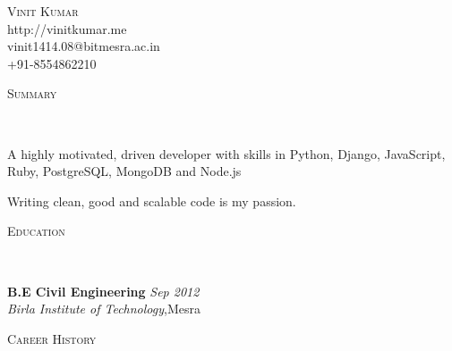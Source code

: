 \documentclass[9pt]{article}
\newenvironment{changemargin}[2]{%
  \begin{list}{}{%
    \setlength{\topsep}{0pt}%
    \setlength{\leftmargin}{#1}%
    \setlength{\rightmargin}{#2}%
    \setlength{\listparindent}{\parindent}%
    \setlength{\itemindent}{\parindent}%
    \setlength{\parsep}{\parskip}%
  }%
  \item[]}{\end{list}
}
\newcommand{\lineover}{
	\begin{changemargin}{-0.05in}{-0.05in}
		\vspace*{-8pt}
		\hrulefill \\
		\vspace*{-2pt}
	\end{changemargin}
}
\newcommand{\header}[1]{
	\begin{changemargin}{-0.5in}{-0.5in}
		\scshape{#1}\\
  	\lineover
	\end{changemargin}
}
\newcommand{\contact}[4]{
	\begin{changemargin}{-0.5in}{-0.5in}
		\begin{center}
			{\Large \scshape {#1}}\\ \smallskip
			{#2}\\ \smallskip 
			{#3}\\ \smallskip
			{#4}\smallskip
		\end{center}
	\end{changemargin}
}
\newenvironment{body} {
	\vspace*{-16pt}
	\begin{changemargin}{-0.25in}{-0.5in}
  }	
	{\end{changemargin}
}
\begin{document}
\contact{Vinit Kumar}{http://vinitkumar.me}{vinit1414.08@bitmesra.ac.in}{+91-8554862210}


\header{Summary}

\begin{body}
	\vspace{14pt}
A highly motivated, driven developer with skills in Python, Django, JavaScript, Ruby, PostgreSQL, MongoDB and Node.js

Writing clean, good and scalable code is my passion. 

\end{body}

\smallskip


\header{Education}

\begin{body}
	\vspace{14pt}
	\textbf{B.E Civil Engineering }{} \hfill \emph{Sep 2012}{} \\
	\emph{Birla Institute of Technology},Mesra{} \\
\end{body}

\smallskip


\header{Career History}
\end{document}
